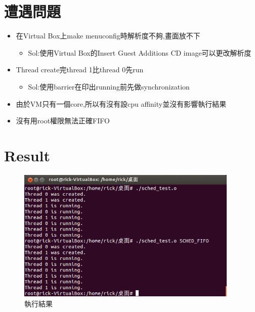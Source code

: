 \documentclass{res}
\begin{document}
\begin{resume}
\section{\large 遭遇問題}
\begin{itemize}[leftmargin=-1.em]

	\item 在Virtual Box上make menuconfig時解析度不夠,畫面放不下
		\begin{itemize}	
		\item[] Sol:使用Virtual Box的Insert Guest Additions CD image可以更改解析度
		\end{itemize}
	\item Thread create完thread 1比thread 0先run
	\begin{itemize}
		\item[] Sol:使用barrier在印出running前先做synchronization
	\end{itemize}
	\item 由於VM只有一個core,所以有沒有設cpu affinity並沒有影響執行結果
	\item 沒有用root權限無法正確FIFO
\end{itemize}


\section{\large Result}
\begin{figure}[htp]
    \begin{center}
        \includegraphics[width=300pt]{images/result.png}
        \caption{執行結果}
        \label{fig:result}
    \end{center}
\end{figure}
\end{resume}
\end{document}
